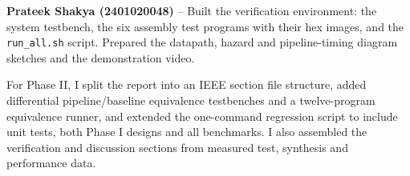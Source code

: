 \textbf{Prateek Shakya (2401020048)} -- Built the verification environment: the system
testbench, the six assembly test programs with their hex images, and the
\texttt{run\_all.sh} script. Prepared the datapath, hazard and pipeline-timing diagram
sketches and the demonstration video.

For Phase II, I split the report into an IEEE section file structure, added
differential pipeline/baseline equivalence testbenches and a twelve-program
equivalence runner, and extended the one-command regression script to include
unit tests, both Phase I designs and all benchmarks. I also assembled the
verification and discussion sections from measured test, synthesis and
performance data.

